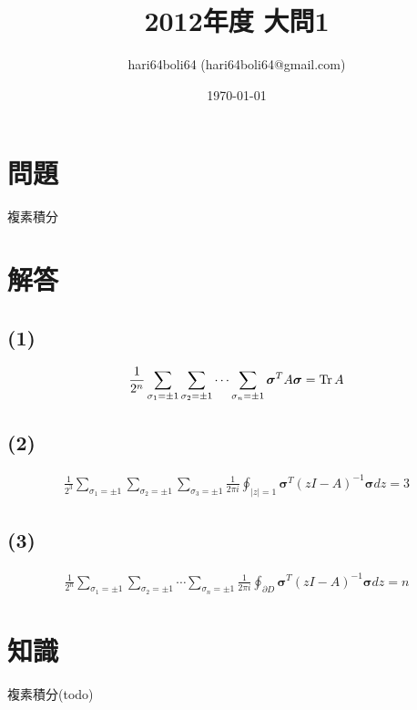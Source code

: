 \documentclass[a4paper, 10pt, dvipdfmx]{jlreq}
\begin{document}
\title{2012年度 大問1}
\author{hari64boli64 (hari64boli64@gmail.com)}
\date{\today}
\maketitle

\section{問題}

複素積分

\section{解答}

\subsection*{(1)}

\begin{align*}
  \frac{1}{2^n}\sum_{\sigma_1=\pm1}\sum_{\sigma_2=\pm1}\cdots\sum_{\sigma_n=\pm1}\bm{\sigma}^TA\bm{\sigma}=\Tr A
\end{align*}

\subsection*{(2)}

\begin{align*}
  \frac{1}{2^3}\sum_{\sigma_1=\pm1}\sum_{\sigma_2=\pm1}\sum_{\sigma_3=\pm1}\frac{1}{2 \pi i}\oint_{|z|=1}\bm{\sigma}^T(zI-A)^{-1}\bm{\sigma}dz=3
\end{align*}

\subsection*{(3)}

\begin{align*}
  \frac{1}{2^n}\sum_{\sigma_1=\pm1}\sum_{\sigma_2=\pm1}\cdots\sum_{\sigma_n=\pm1}\frac{1}{2 \pi i}\oint_{\partial D}\bm{\sigma}^T(zI-A)^{-1}\bm{\sigma}dz=n
\end{align*}

\section{知識}

複素積分(todo)


\end{document}
